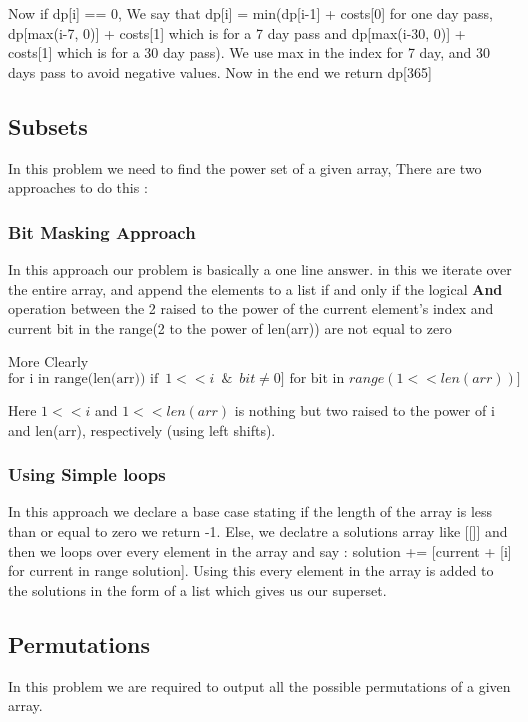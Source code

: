 \documentclass{article}
\newcommand{\nd}{\noindent}
\begin{document}
\nd Now if dp[i] == 0, We say that dp[i] = min(dp[i-1] + costs[0] for one day pass, dp[max(i-7, 0)] + costs[1] which is for a 7 day pass and dp[max(i-30, 0)] + costs[1] which is for a 30 day pass). We use max in the index for 7 day, and 30 days pass to avoid negative values. Now in the end we return dp[365]

\subsection{Subsets}
In this problem we need to find the power set of a given array, There are two approaches to do this : 
\subsubsection{Bit Masking Approach}
In this approach our problem is basically a one line answer. in this we iterate over the entire array, and append the elements to a list if and only if the logical \textbf{And} operation between the 2 raised to the power of the current element's index and current bit in the range(2 to the power of len(arr)) are not equal to zero

\nd More Clearly 
\begin{equation*}
[[arr[i] \text{for i in range(len(arr)) if}\,\,\, 1<<i \,\,\,  \& \,\,\, bit \neq 0]\,\, \text{for bit in } range(1 <<len(arr))] 
\end{equation*} 

\nd Here $1<<i$ and $1<<len(arr)$ is nothing but two raised to the power of i and len(arr), respectively (using left shifts). 

\subsubsection{Using Simple loops}
In this approach we declare a base case stating if the length of the array is less than or equal to zero we return -1. Else, we declatre a solutions array like [[]] and then we loops over every element in the array and say : solution += [current + [i] for current in range solution]. Using this every element in the array is added to the solutions in the form of a list which gives us our superset. 

\subsection{Permutations}
In this problem we are required to output all the possible permutations of a given array. 
\end{document}
